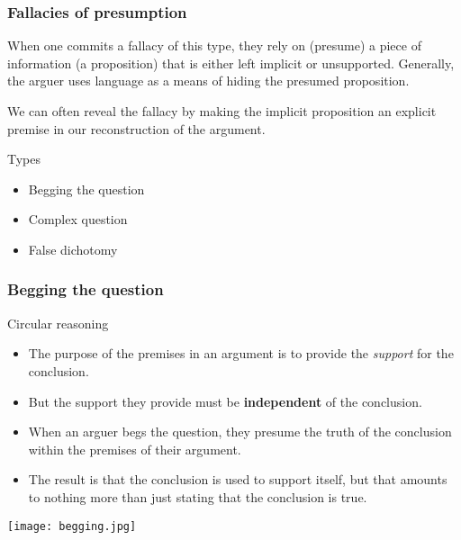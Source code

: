 \documentclass[10pt,letterpaper,xcolor=dvipsnames,handout]{beamer}
\begin{document}
\begin{frame}
\frametitle{Fallacies of presumption}

When one commits a fallacy of this type, they rely on (presume) a piece of information (a proposition) that is either left implicit or unsupported.  Generally, the arguer uses language as a means of hiding the presumed proposition.

We can often reveal the fallacy by making the implicit proposition an explicit premise in our reconstruction of the argument.

\begin{block}{Types}
  \begin{itemize}
    \item Begging the question
    \item Complex question
    \item False dichotomy
  \end{itemize}
\end{block}

\end{frame}

\begin{frame}
  \frametitle{Begging the question}
  \small
  
  \begin{block}{Circular reasoning}
    \begin{itemize}
      \item The purpose of the premises in an argument is to provide the \textit{support} for the conclusion.
      \item But the support they provide must be \textbf{independent} of the conclusion.
      \item When an arguer begs the question, they presume the truth of the conclusion within the premises of their argument.
      \item The result is that the conclusion is used to support itself, but that amounts to nothing more than just stating that the conclusion is true.
    \end{itemize}
  \end{block}
  
  
  \begin{center}
    \texttt{[image: begging.jpg]}
  \end{center}
  
\end{frame}
\end{document}
